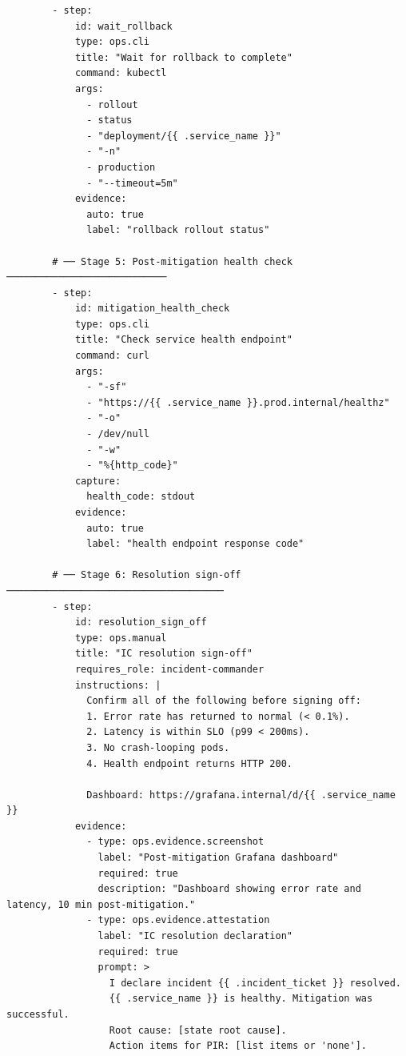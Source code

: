 \begin{verbatim}
        - step:
            id: wait_rollback
            type: ops.cli
            title: "Wait for rollback to complete"
            command: kubectl
            args:
              - rollout
              - status
              - "deployment/{{ .service_name }}"
              - "-n"
              - production
              - "--timeout=5m"
            evidence:
              auto: true
              label: "rollback rollout status"

        # ── Stage 5: Post-mitigation health check ────────────────────────────
        - step:
            id: mitigation_health_check
            type: ops.cli
            title: "Check service health endpoint"
            command: curl
            args:
              - "-sf"
              - "https://{{ .service_name }}.prod.internal/healthz"
              - "-o"
              - /dev/null
              - "-w"
              - "%{http_code}"
            capture:
              health_code: stdout
            evidence:
              auto: true
              label: "health endpoint response code"

        # ── Stage 6: Resolution sign-off ──────────────────────────────────────
        - step:
            id: resolution_sign_off
            type: ops.manual
            title: "IC resolution sign-off"
            requires_role: incident-commander
            instructions: |
              Confirm all of the following before signing off:
              1. Error rate has returned to normal (< 0.1%).
              2. Latency is within SLO (p99 < 200ms).
              3. No crash-looping pods.
              4. Health endpoint returns HTTP 200.

              Dashboard: https://grafana.internal/d/{{ .service_name }}
            evidence:
              - type: ops.evidence.screenshot
                label: "Post-mitigation Grafana dashboard"
                required: true
                description: "Dashboard showing error rate and latency, 10 min post-mitigation."
              - type: ops.evidence.attestation
                label: "IC resolution declaration"
                required: true
                prompt: >
                  I declare incident {{ .incident_ticket }} resolved.
                  {{ .service_name }} is healthy. Mitigation was successful.
                  Root cause: [state root cause].
                  Action items for PIR: [list items or 'none'].
\end{verbatim}
